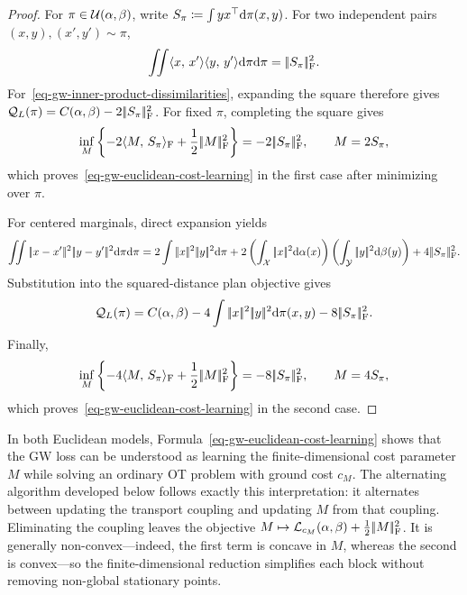 \begin{proof}
	For $\pi\in\mathcal{U}(\alpha,\beta)$, write $S_\pi\coloneqq\int yx^\top\mathrm{d}\pi(x,y)$.
	For two independent pairs $(x,y),(x',y')\sim\pi$,
	\[
		\iint\langle x,\,x'\rangle\langle y,\,y'\rangle\mathrm{d}\pi\mathrm{d}\pi
		=
		|\!| S_\pi |\!|_{\mathrm F}^2.
	\]
	For~\eqref{eq-gw-inner-product-dissimilarities}, expanding the square therefore gives $\mathcal Q_L(\pi)=C(\alpha,\beta)-2|\!| S_\pi |\!|_{\mathrm F}^2$. For fixed $\pi$, completing the square gives
	\[
		\inf_M
		\left\{-2\langle M,\,S_\pi\rangle_{\mathrm F}+\frac12|\!| M |\!|_{\mathrm F}^2\right\}
		=-2|\!| S_\pi |\!|_{\mathrm F}^2,
		\qquad M=2S_\pi,
	\]
	which proves~\eqref{eq-gw-euclidean-cost-learning} in the first case after minimizing over $\pi$.

	For centered marginals, direct expansion yields
	\[
		\iint\norm{x-x'}^2\norm{y-y'}^2\d\pi\d\pi
		=
		2\int\norm{x}^2\norm{y}^2\d\pi
		+2
		\left(\int_\X\norm{x}^2\d\alpha(x)\right)
		\left(\int_\Y\norm{y}^2\d\beta(y)\right)
		+4\norm{S_\pi}_{\mathrm F}^2.
	\]
	Substitution into the squared-distance plan objective gives
	\begin{equation}\label{eq-gw-squared-distance-cost-regularization}
		\mathcal Q_L(\pi)
		=
		C(\alpha,\beta)
		-4\int|\!| x |\!|^2|\!| y |\!|^2\mathrm{d}\pi(x,y)
		-8|\!| S_\pi |\!|_{\mathrm F}^2.
	\end{equation}
	Finally,
	\[
		\inf_M
		\left\{-4\langle M,\,S_\pi\rangle_{\mathrm F}+\frac12|\!| M |\!|_{\mathrm F}^2\right\}
		=-8|\!| S_\pi |\!|_{\mathrm F}^2,
		\qquad M=4S_\pi,
	\]
	which proves~\eqref{eq-gw-euclidean-cost-learning} in the second case.
\end{proof}

In both Euclidean models, Formula~\eqref{eq-gw-euclidean-cost-learning} shows that the GW loss can be understood as learning the finite-dimensional cost parameter $M$ while solving an ordinary OT problem with ground cost $c_M$. The alternating algorithm developed below follows exactly this interpretation: it alternates between updating the transport coupling and updating $M$ from that coupling. Eliminating the coupling leaves the objective
$M\mapsto\mathcal{L}_{c_M}(\alpha,\beta)+\frac12|\!| M |\!|_{\mathrm F}^2$.
It is generally non-convex---indeed, the first term is concave in $M$, whereas the second is convex---so the finite-dimensional reduction simplifies each block without removing non-global stationary points.

